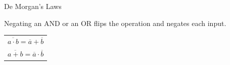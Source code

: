 \documentclass[mathserif, handout]{beamer}
\begin{document}
\begin{frame}{De Morgan's Laws}
  \begin{center}
    \Large {}
  \end{center}
\end{frame}

\begin{frame}
  Negating an AND or an OR flips the operation and negates each input.\\[6mm]
  \begin{center}
    \renewcommand{\arraystretch}{2.2}
    \begin{tabular}{c}
      $\overline{a \cdot b} = \overline{a} + \overline{b}$ \\
      $\overline{a + b} = \overline{a} \cdot \overline{b}$ \\
    \end{tabular}
  \end{center}
  \vspace{2mm}
  \begin{center}
  \end{center}
\end{frame}
\end{document}
